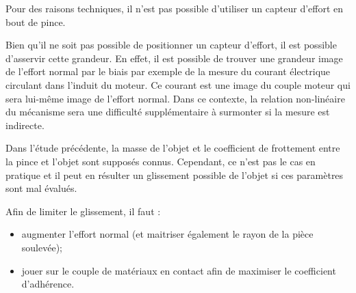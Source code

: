 Pour des raisons techniques, il n'est pas possible d'utiliser un capteur d'effort en bout de pince.

\ifprof
\begin{corrige}
Bien qu’il ne soit pas possible de positionner un capteur d’effort, il est possible d’asservir cette grandeur. En effet, il est possible de trouver une grandeur image de l’effort normal par le biais par exemple de la mesure du courant électrique circulant dans l’induit du moteur. Ce courant est une image du couple moteur qui sera lui-même image de l’effort normal. Dans ce contexte, la relation non-linéaire du mécanisme sera une difficulté supplémentaire à surmonter si la mesure est indirecte.
\end{corrige}
\else
\fi
\ifprof
\else
Dans l'étude précédente, la masse de l'objet et le coefficient de frottement entre la pince et l'objet
sont supposés connus. Cependant, ce n’est pas le cas en pratique et il peut en résulter un
glissement possible de l’objet si ces paramètres sont mal évalués.
\fi

\ifprof
\begin{corrige}
Afin de limiter le glissement, il faut :
\begin{itemize}
\item augmenter l’effort normal (et maitriser également le rayon de la pièce soulevée);
\item jouer sur le couple de matériaux en contact afin de maximiser le coefficient d’adhérence.
\end{itemize}

\end{corrige}
\else
\fi

